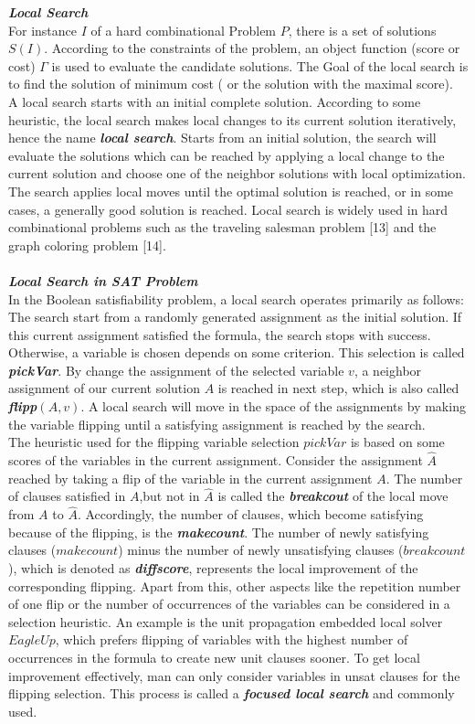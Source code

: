 \documentclass[12pt,a4paper,twoside]{scrartcl}
\numberwithin{equation}{section}
\begin{document}
\emph{\textbf{Local Search}}\\
For instance $I$ of a hard combinational Problem $P$, there is a set of solutions $S(I)$.  According to the constraints of the problem, an object function (score or cost) $\Gamma$ is used to evaluate the candidate solutions. The Goal of the local search is to find the solution of minimum cost ( or the solution with the maximal score).\\
A local search starts with an initial complete solution. According to some heuristic, the local search makes local changes to its current solution iteratively, hence the name \emph{\textbf{local search}}. Starts from an initial solution, the search will evaluate the solutions which can be reached by applying a local change to the current solution and choose one of the neighbor solutions with local optimization. The search applies local moves until the optimal solution is reached, or in some cases, a generally good solution is reached.  Local search is widely used in hard combinational problems such as the traveling salesman problem [13] and the graph coloring problem [14]. \\
\\
\emph{\textbf{Local Search in SAT Problem}}\\
In the Boolean satisfiability problem, a local search operates primarily as follows: The search start from a randomly generated assignment as the initial solution. If this current assignment satisfied the formula, the search stops with success. Otherwise, a variable is chosen depends on some criterion. This selection is called \emph{\textbf{pickVar}}. By change the assignment of the selected variable $v$, a neighbor assignment of our current solution $A$ is reached in next step, which is also called  \emph{\textbf{flipp$(A,v)$}}. A local search will move in the space of the assignments by making the variable flipping until a satisfying assignment is reached by the search. \\
The heuristic used for the flipping variable selection $pickVar$  is based on some scores of the variables in the current assignment. Consider the assignment $\hat{A}$  reached by taking a flip of the variable in the current assignment $A$. The number of clauses satisfied in $A$,but not in $\hat{A}$ is called the \emph{\textbf{breakcout}} of the local move from $A$ to $\hat{A}$. Accordingly, the number of clauses, which become satisfying because of the flipping, is the  \emph{\textbf{makecount}}. The number of newly satisfying clauses ($makecount$) minus the number of newly unsatisfying clauses ($breakcount$), which is denoted as \emph{\textbf{diffscore}}, represents the local improvement of the corresponding flipping. Apart from this, other aspects like the repetition number of one flip or the number of occurrences of the variables can be considered in a selection heuristic. An example is the unit propagation embedded local solver $EagleUp$, which prefers flipping of variables with the highest number of occurrences in the formula to create new unit clauses sooner. To get local improvement effectively, man can only consider variables in unsat clauses for the flipping selection. This process is called a \emph{\textbf{focused local search}} and commonly used. \\
\end{document}
